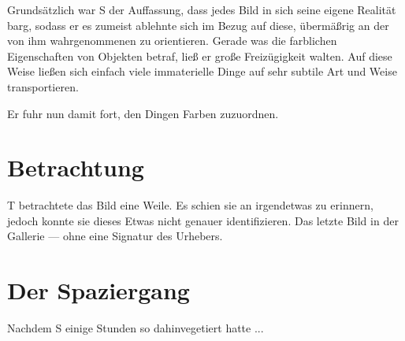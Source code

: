 \documentclass{article}
\begin{document}
Grundsätzlich war S der Auffassung, dass jedes Bild in sich seine eigene Realität barg, sodass er es zumeist ablehnte sich im Bezug auf diese, übermäßrig an der von ihm wahrgenommenen zu orientieren. Gerade was die farblichen Eigenschaften von Objekten betraf, ließ er große Freizügigkeit walten. Auf diese Weise ließen sich einfach viele immaterielle Dinge auf sehr subtile Art und Weise transportieren.

Er fuhr nun damit fort, den Dingen Farben zuzuordnen. 

\chapter{Betrachtung}

T betrachtete das Bild eine Weile. Es schien sie an irgendetwas zu erinnern, jedoch konnte sie dieses Etwas nicht genauer identifizieren.
Das letzte Bild in der Gallerie --- ohne eine Signatur des Urhebers.


\chapter{Der Spaziergang}

Nachdem S einige Stunden so dahinvegetiert hatte ...
\end{document}
